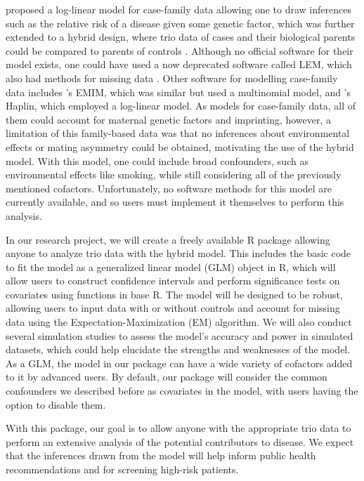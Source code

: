 \documentclass[12pt]{article}
\begin{document}
\cite{Wein98} proposed a log-linear model for case-family data allowing one to draw inferences such as the relative risk of a disease given some genetic factor, which was further extended to a hybrid design, where trio data of cases and their biological parents could be compared to parents of controls \citep{Wein05}. Although no official software for their model exists, one could have used a now deprecated software called LEM, which also had methods for missing data \citep{Verm97}.  Other software for modelling case-family data includes \cite{Howe12}'s EMIM, which was similar but used a multinomial model, and \cite{Gjer19}'s Haplin, which employed a log-linear model.  As models for case-family data, all of them could account for maternal genetic factors and imprinting, however, a limitation of this family-based data was that no inferences about environmental effects or mating asymmetry could be obtained, motivating the use of the hybrid model.  With this model, one could include broad confounders, such as environmental effects like smoking, while still considering all of the previously mentioned cofactors.  Unfortunately, no software methods for this model are currently available, and so users must implement it themselves to perform this analysis.

In our research project, we will create a freely available R package allowing anyone to analyze trio data with the hybrid model.  This includes the basic code to fit the model as a generalized linear model (GLM) object in R, which will allow users to construct confidence intervals and perform significance tests on covariates using functions in base R.  The model will be designed to be robust, allowing users to input data with or without controls and account for missing data using the Expectation-Maximization (EM) algorithm.  We will also conduct several simulation studies to assess the model's accuracy and power in simulated datasets, which could help elucidate the strengths and weaknesses of the model.  As a GLM, the model in our package can have a wide variety of cofactors added to it by advanced users.  By default, our package will consider the common confounders we described before as covariates in the model, with users having the option to disable them.

With this package, our goal is to allow anyone with the appropriate trio data to perform an extensive analysis of the potential contributors to disease.  We expect that the inferences drawn from the model will help inform public health recommendations and for screening high-risk patients.

\newpage


\end{document}
